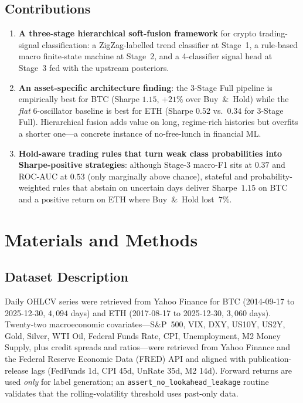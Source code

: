 \documentclass[conference]{IEEEtran}
\begin{document}
\subsection{Contributions}
\begin{enumerate}
\item \textbf{A three-stage hierarchical soft-fusion framework} for crypto trading-signal classification: a ZigZag-labelled trend classifier at Stage~1, a rule-based macro finite-state machine at Stage~2, and a 4-classifier signal head at Stage~3 fed with the upstream posteriors.
\item \textbf{An asset-specific architecture finding}: the 3-Stage Full pipeline is empirically best for BTC (Sharpe $1.15$, $+21\%$ over Buy~\&~Hold) while the \emph{flat} 6-oscillator baseline is best for ETH (Sharpe $0.52$ vs.~$0.34$ for 3-Stage Full). Hierarchical fusion adds value on long, regime-rich histories but overfits a shorter one---a concrete instance of no-free-lunch in financial ML.
\item \textbf{Hold-aware trading rules that turn weak class probabilities into Sharpe-positive strategies}: although Stage-3 macro-F1 sits at $0.37$ and ROC-AUC at $0.53$ (only marginally above chance), stateful and probability-weighted rules that abstain on uncertain days deliver Sharpe~$1.15$ on BTC and a positive return on ETH where Buy~\&~Hold lost~$7\%$.
\end{enumerate}

\section{Materials and Methods}

\subsection{Dataset Description}
\label{sec:dataset}
Daily OHLCV series were retrieved from Yahoo Finance for BTC (2014-09-17 to 2025-12-30, $4{,}094$ days) and ETH (2017-08-17 to 2025-12-30, $3{,}060$ days). Twenty-two macroeconomic covariates---S\&P~500, VIX, DXY, US10Y, US2Y, Gold, Silver, WTI Oil, Federal Funds Rate, CPI, Unemployment, M2 Money Supply, plus credit spreads and ratios---were retrieved from Yahoo Finance and the Federal Reserve Economic Data (FRED) API and aligned with publication-release lags (FedFunds 1d, CPI 45d, UnRate 35d, M2 14d). Forward returns are used \emph{only} for label generation; an \texttt{assert\_no\_lookahead\_leakage} routine validates that the rolling-volatility threshold uses past-only data.
\end{document}
